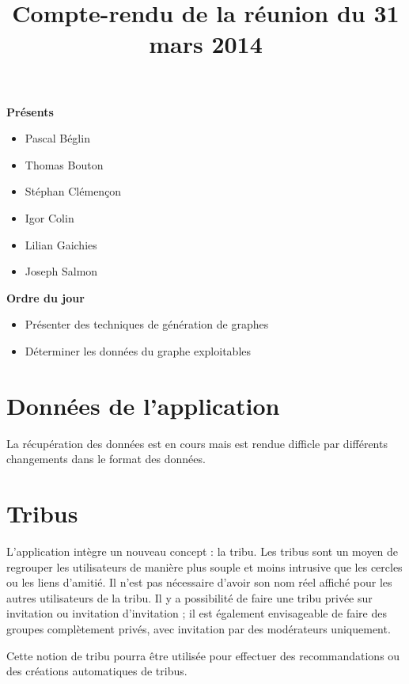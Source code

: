 \documentclass[a4paper]{article}
\title{Compte-rendu de la r\'eunion du 31 mars 2014}
\author{}
\date{}
\begin{document}
\maketitle

\begin{description}
    \item \textbf{Présents}
        \begin{itemize}
            \item Pascal Béglin
            \item Thomas Bouton
            \item Stéphan Clémençon
            \item Igor Colin
            \item Lilian Gaichies
            \item Joseph Salmon
        \end{itemize}
    \item \textbf{Ordre du jour}
        \begin{itemize}
            \item Présenter des techniques de g\'en\'eration de graphes
            \item Déterminer les donn\'ees du graphe exploitables
        \end{itemize}
\end{description}

\section{Données de l'application}

La récupération des données est en cours mais est rendue difficle par
différents changements dans le format des données.

\section{Tribus}
\label{sec:tribus}
L'application intègre un nouveau concept : la tribu. Les tribus sont un moyen
de regrouper les utilisateurs de manière plus souple et moins intrusive que les
cercles ou les liens d'amitié. Il n'est pas nécessaire d'avoir son nom réel
affiché pour les autres utilisateurs de la tribu. Il y a possibilité de faire
une tribu privée sur invitation ou invitation d'invitation ; il est également
envisageable de faire des groupes complètement privés, avec invitation par des
modérateurs uniquement.

Cette notion de tribu pourra être utilis\'ee pour effectuer des
recommandations ou des créations automatiques de tribus.
\end{document}
